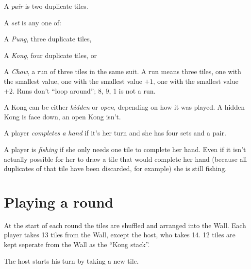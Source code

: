 \documentclass{article}
\begin{document}
A \emph{pair} is two duplicate tiles.

A \emph{set} is any one of:
\begin{enumerate*}
    \item A \emph{Pung}, three duplicate tiles,
    \item A \emph{Kong}, four duplicate tiles, or
    \item A \emph{Chow}, a run of three tiles in the same suit. A run means three tiles, one with the smallest value, one with the smallest value $+1$, one with the smallest value $+2$. Runs don't ``loop around''; 8, 9, 1 is not a run.
\end{enumerate*}

A Kong can be either \emph{hidden} or \emph{open}, depending on how it was played. A hidden Kong is face down, an open Kong isn't.

A player \emph{completes a hand} if it's her turn and she has four sets and a pair.

A player is \emph{fishing} if she only needs one tile to complete her hand. Even if it isn't actually possible for her to draw a tile that would complete her hand (because all duplicates of that tile have been discarded, for example) she is still fishing.

\section{Playing a round}
At the start of each round the tiles are shuffled and arranged into the Wall. Each player takes 13 tiles from the Wall, except the host, who takes 14. 12 tiles are kept seperate from the Wall as the ``Kong stack''.

The host starts his turn by taking a new tile.
\end{document}
